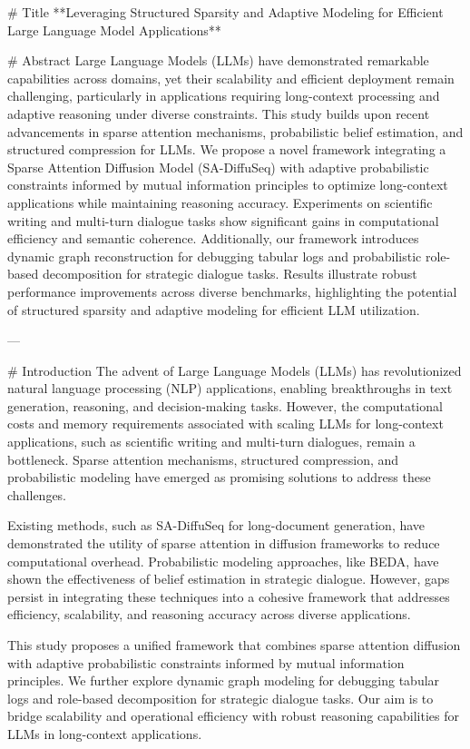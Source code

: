 # Title  
**Leveraging Structured Sparsity and Adaptive Modeling for Efficient Large Language Model Applications**  

# Abstract  
Large Language Models (LLMs) have demonstrated remarkable capabilities across domains, yet their scalability and efficient deployment remain challenging, particularly in applications requiring long-context processing and adaptive reasoning under diverse constraints. This study builds upon recent advancements in sparse attention mechanisms, probabilistic belief estimation, and structured compression for LLMs. We propose a novel framework integrating a Sparse Attention Diffusion Model (SA-DiffuSeq) with adaptive probabilistic constraints informed by mutual information principles to optimize long-context applications while maintaining reasoning accuracy. Experiments on scientific writing and multi-turn dialogue tasks show significant gains in computational efficiency and semantic coherence. Additionally, our framework introduces dynamic graph reconstruction for debugging tabular logs and probabilistic role-based decomposition for strategic dialogue tasks. Results illustrate robust performance improvements across diverse benchmarks, highlighting the potential of structured sparsity and adaptive modeling for efficient LLM utilization.  

---

# Introduction  
The advent of Large Language Models (LLMs) has revolutionized natural language processing (NLP) applications, enabling breakthroughs in text generation, reasoning, and decision-making tasks. However, the computational costs and memory requirements associated with scaling LLMs for long-context applications, such as scientific writing and multi-turn dialogues, remain a bottleneck. Sparse attention mechanisms, structured compression, and probabilistic modeling have emerged as promising solutions to address these challenges.  

Existing methods, such as SA-DiffuSeq for long-document generation, have demonstrated the utility of sparse attention in diffusion frameworks to reduce computational overhead. Probabilistic modeling approaches, like BEDA, have shown the effectiveness of belief estimation in strategic dialogue. However, gaps persist in integrating these techniques into a cohesive framework that addresses efficiency, scalability, and reasoning accuracy across diverse applications.  

This study proposes a unified framework that combines sparse attention diffusion with adaptive probabilistic constraints informed by mutual information principles. We further explore dynamic graph modeling for debugging tabular logs and role-based decomposition for strategic dialogue tasks. Our aim is to bridge scalability and operational efficiency with robust reasoning capabilities for LLMs in long-context applications.  

